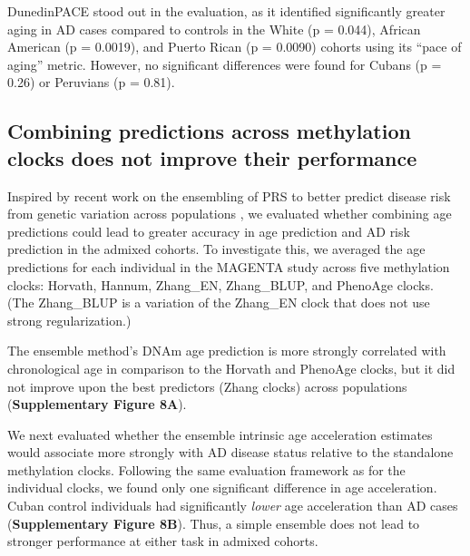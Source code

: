 DunedinPACE stood out in the evaluation, as it identified significantly greater aging in AD cases compared to controls in the White (p = 0.044), African American (p = 0.0019), and Puerto Rican (p = 0.0090) cohorts using its ``pace of aging'' metric. However, no significant differences were found for Cubans (p = 0.26) or Peruvians (p = 0.81).

\alzheimersanalysis


\subsection{Combining predictions across methylation clocks does not improve their performance}
Inspired by recent work on the ensembling of PRS to better predict disease risk from genetic variation across populations \citep{monti_evaluation_2024}, we evaluated whether combining age predictions could lead to greater accuracy in age prediction and AD risk prediction in the admixed cohorts. To investigate this, we averaged the age predictions for each individual in the MAGENTA study across five methylation clocks: Horvath, Hannum, Zhang\_EN, Zhang\_BLUP, and PhenoAge clocks. (The Zhang\_BLUP is a variation of the Zhang\_EN clock that does not use strong regularization.) 

The ensemble method's DNAm age prediction is more strongly correlated with chronological age in comparison to the Horvath and PhenoAge clocks, but it did not improve upon the best predictors (Zhang clocks) across populations (\textbf{Supplementary Figure 8A}).

We next evaluated whether the ensemble intrinsic age acceleration estimates would associate more strongly with AD disease status relative to the standalone methylation clocks. Following the same evaluation framework as for the individual clocks, we found only one significant difference in age acceleration. Cuban control individuals had significantly \textit{lower} age acceleration than AD cases (\textbf{Supplementary Figure 8B}). Thus, a simple ensemble does not lead to stronger performance at either task in admixed cohorts.

